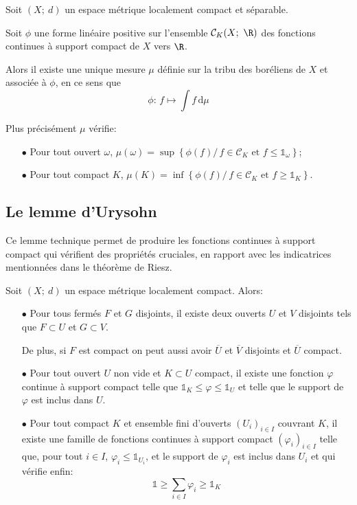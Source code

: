 \begin{theo}
Soit $(X;~d)$ un espace métrique localement compact et séparable.

\medskip
Soit $\phi$ une forme linéaire positive sur l'ensemble $\mathcal{C}_K(X;~\R)$ des fonctions continues à support compact de $X$ vers $\R$.

\medskip
Alors il existe une unique mesure $\mu$ définie sur la tribu des boréliens de $X$ et associée à $\phi$, en ce sens que 
\[
\phi: \, f \mapsto \displaystyle{\int} f \, \mathrm d \mu
\]

Plus précisément $\mu$ vérifie:
\begin{itemize}
\item[$\bullet$] 
Pour tout ouvert $\omega$, $\mu(\omega) = \sup  \left \{ 
\phi(f)/ \, f \in \mathcal{C}_K \text{ et } f \leq \mathbb{1}_{\omega}
\right \}$;
\item[$\bullet$] 
Pour tout compact $K$, $\mu(K) = \inf \left \{ 
\phi(f)/ \, f \in \mathcal{C}_K \text{ et } f \geq \mathbb{1}_{K}
\right \}$.
\end{itemize}

\end{theo}


\subsection{Le lemme d'Urysohn}

Ce lemme technique permet de produire les fonctions continues à support compact qui vérifient des propriétés cruciales, en rapport avec les indicatrices mentionnées dans le théorème de Riesz.


\begin{lem}[Urysohn]
Soit $(X;~d)$ un espace métrique localement compact. Alors:
\begin{itemize}
\item[$\bullet$] 
Pour tous fermés $F$ et $G$ disjoints, il existe deux ouverts $U$ et $V$ disjoints tels que $F \subset U$ et $G \subset V$.

De plus, si $F$ est compact on peut aussi avoir $\overline{U}$ et $\overline{V}$ disjoints et $\overline{U}$ compact.
\item[$\bullet$] 
Pour tout ouvert $U$ non vide et $K \subset U$ compact, il existe une fonction $\varphi$ continue à support compact telle que $\mathbb{1}_K \leq \varphi \leq \mathbb{1}_U$ et telle que le support de $\varphi$ est inclus dans $U$.
\item[$\bullet$] 
Pour tout compact $K$ et ensemble fini d'ouverts $(U_i)_{i \in I}$ couvrant $K$, il existe une famille de fonctions continues à support compact $(\varphi_i)_{i \in I}$ telle que, pour tout $i \in I$, $\varphi_i \leq \mathbb{1}_{U_i}$, et le support de $\varphi_i$ est inclus dans $U_i$ et qui vérifie enfin:
\[
\mathbb{1} \geq \displaystyle{\sum \limits_{i \in I}} \varphi_i \geq \mathbb{1}_K
\]
\end{itemize}
\end{lem}

